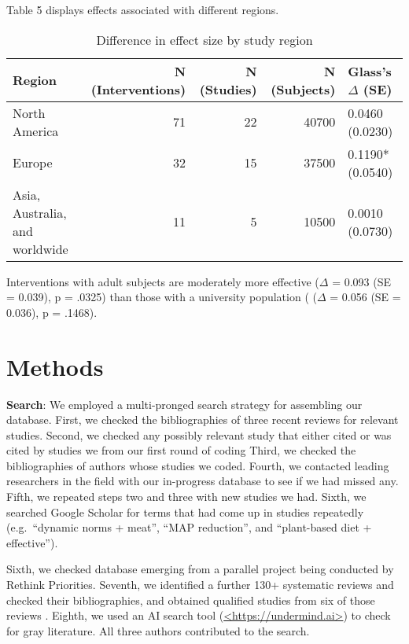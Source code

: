 \documentclass[sn-nature,pdflatex]{sn-jnl}
\begin{document}
Table 5 displays effects associated with different regions.

\begin{table}[!h]
\centering
\caption{\label{tab:table_five}Difference in effect size by study region}
\centering
\begin{tabular}[t]{lrrrl}
\toprule
Region & N (Interventions) & N (Studies) & N (Subjects) & Glass's $\Delta$ (SE)\\
\midrule
North America & 71 & 22 & 40700 & 0.0460 (0.0230)\\
Europe & 32 & 15 & 37500 & 0.1190* (0.0540)\\
Asia, Australia, and worldwide & 11 & 5 & 10500 & 0.0010 (0.0730)\\
\bottomrule
\end{tabular}
\end{table}

Interventions with adult subjects are moderately more effective
(\(\Delta\) = 0.093 (SE = 0.039), p = .0325) than those with a
university population ( (\(\Delta\) = 0.056 (SE = 0.036), p = .1468).

\section{Methods}\label{sec3}

\textbf{Search}: We employed a multi-pronged search strategy for
assembling our database. First, we checked the bibliographies of three
recent reviews
\citep{mathur2021meta, bianchi2018conscious, bianchi2018restructuring}
for relevant studies. Second, we checked any possibly relevant study
that either cited or was cited by studies we from our first round of
coding Third, we checked the bibliographies of authors whose studies we
coded. Fourth, we contacted leading researchers in the field with our
in-progress database to see if we had missed any. Fifth, we repeated
steps two and three with new studies we had. Sixth, we searched Google
Scholar for terms that had come up in studies repeatedly (e.g.~``dynamic
norms + meat'', ``MAP reduction'', and ``plant-based diet +
effective'').

\begin{comment} 
does this need more description? This is not entirely reproducible I think but TBH it was not a major source of studies in our database
\end{comment}

Sixth, we checked database emerging from a parallel project being
conducted by Rethink Priorities. Seventh, we identified a further 130+
systematic reviews and checked their bibliographies, and obtained
qualified studies from six of those reviews
\citep{ammann2023, chang2023, DiGennaro2024, harguess2020, ronto2022, wynes2018}.
Eighth, we used an AI search tool (\url{<https://undermind.ai>}) to
check for gray literature. All three authors contributed to the search.
\end{document}
